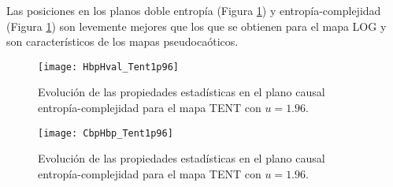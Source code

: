 Las posiciones en los planos doble entropía (Figura \ref{fig:TENT1p96_HH}) y entropía-complejidad (Figura \ref{fig:TENT1p96_HH}) son levemente mejores que los que se obtienen para el mapa LOG y son característicos de los mapas pseudocaóticos.
%
\begin{figure}[htpb]
	\centering
	\texttt{[image: HbpHval\_Tent1p96]}
	\caption{Evolución de las propiedades estadísticas en el plano causal entropía-complejidad para el mapa TENT con $u=1.96$.}
	\label{fig:TENT1p96_HH}
\end{figure}
%
\begin{figure}[htpb]
	\centering
	\texttt{[image: CbpHbp\_Tent1p96]}
	\caption{$H_{BP} \times C_{BP}$}
	\caption{Evolución de las propiedades estadísticas en el plano causal entropía-complejidad para el mapa TENT con $u=1.96$.}
	\label{fig:TENT1p96_HbpCbp}
\end{figure}